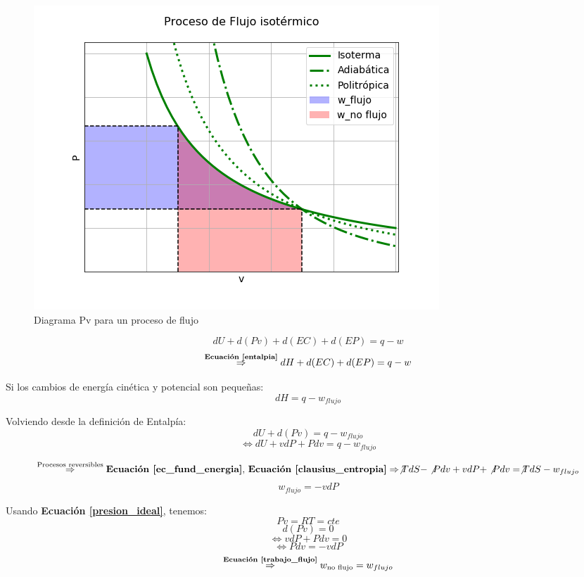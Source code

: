         \begin{multicols}{2}
            \begin{figure}[H]
                \caption{Diagrama Pv para un proceso de flujo}
                \label{fig:proc_flujo}
                \includegraphics[width=\textwidth]{img/graficos/proc_flujo.png}
            \end{figure}
            
            \[dU+d(Pv)+d(EC)+d(EP)=q-w\]
            \[\overset{\text{\textbf{Ecuación \ref{entalpia}}}}{\Rightarrow} dH+d(EC)+d(EP)=q-w\]
            
            Si los cambios de energía cinética y potencial son pequeñas:
            \[dH=q-w_{flujo}\]
            
            Volviendo desde la definición de Entalpía:
            \[dU + d(Pv) = q - w_{flujo}\]
            \[\Leftrightarrow dU + vdP + Pdv = q - w_{flujo}\]
        \end{multicols}
        
        \[\overset{\text{Procesos reversibles}}{\Rightarrow} \text{\textbf{Ecuación \ref{ec_fund_energia}}, \textbf{Ecuación \ref{clausius_entropia}}} \Rightarrow \not{TdS} - \not{Pdv} + vdP + \not{Pdv} = \not{TdS} - w_{flujo}\]
        \begin{equation}
        \label{trabajo_flujo}
            w_{flujo} = -vdP
        \end{equation}
        
            
            Usando \textbf{Ecuación \ref{presion_ideal}}, tenemos:
            \[Pv = RT = cte\]
            \[d(Pv) = 0\]
            \[\Leftrightarrow vdP + Pdv = 0\]
            \[\Leftrightarrow Pdv = - vdP\]
            \[\overset{\text{\textbf{Ecuación \ref{trabajo_flujo}}}}{\Rightarrow} w_{\text{no flujo}} = w_{flujo}\]
            

